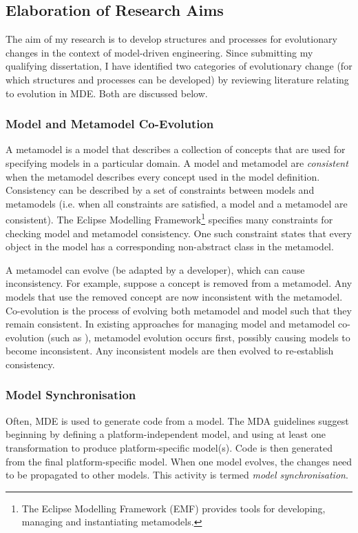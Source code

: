\subsection{Elaboration of Research Aims}
\label{sub:elaboration}
The aim of my research is to develop structures and processes for evolutionary changes in the context of model-driven engineering. Since submitting my qualifying dissertation, I have identified two categories of evolutionary change (for which structures and processes can be developed) by reviewing literature relating to evolution in MDE. Both are discussed below.

\subsubsection{Model and Metamodel Co-Evolution} %
\label{ssub:model_and_metamodel_co_evolution}
A metamodel is a model that describes a collection of concepts that are used for specifying models in a particular domain. A model and metamodel are \emph{consistent} when the metamodel describes every concept used in the model definition. Consistency can be described by a set of constraints between models and metamodels (i.e. when all constraints are satisfied, a model and a metamodel are consistent). The Eclipse Modelling Framework\footnote{The Eclipse Modelling Framework (EMF) \cite{emf} provides tools for developing, managing and instantiating metamodels.} specifies many constraints for checking model and metamodel consistency. One such constraint states that every object in the model has a corresponding non-abstract class in the metamodel.

A metamodel can evolve (be adapted by a developer), which can cause inconsistency. For example, suppose a concept is removed from a metamodel. Any models that use the removed concept are now inconsistent with the metamodel. Co-evolution is the process of evolving both metamodel and model such that they remain consistent. In existing approaches for managing model and metamodel co-evolution (such as \cite{herrmannsdoerfer08cope,cicchetti08automating}), metamodel evolution occurs first, possibly causing models to become inconsistent. Any inconsistent models are then evolved to re-establish consistency.


\subsubsection{Model Synchronisation} %
\label{ssub:model_synchronisation}
Often, MDE is used to generate code from a model. The MDA guidelines suggest beginning by defining a platform-independent model, and using at least one transformation to produce platform-specific model(s). Code is then generated from the final platform-specific model. When one model evolves, the changes need to be propagated to other models. This activity is termed \textit{model synchronisation}.

